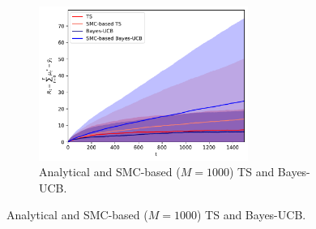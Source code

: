 \begin{figure}[!h]
	\centering
	\begin{subfigure}[b]{\textwidth}
		\centering
		\includegraphics[width=0.75\textwidth]{./fods_figs/static/bernoulli/A2/theta0.8_0.9_M1000_cumulative_regret}
		\caption{Analytical and SMC-based ($M=1000$) TS and Bayes-UCB.}
	\end{subfigure}
	

\end{figure}
